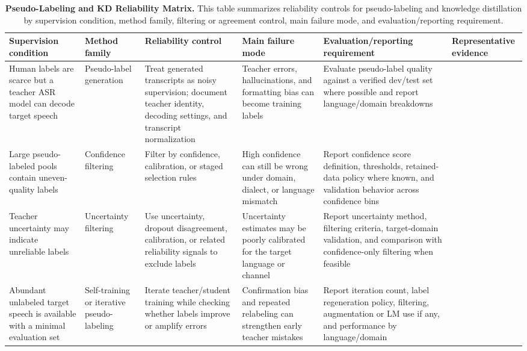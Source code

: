 \documentclass[pdflatex,sn-basic,iicol]{sn-jnl}
\theoremstyle{thmstyleone}
\theoremstyle{thmstyletwo}
\theoremstyle{thmstylethree}
\begin{document}
\begin{table}[htbp]
\setcounter{table}{3}
\footnotesize
\centering
\caption{\textbf{Pseudo-Labeling and KD Reliability Matrix.} This table summarizes reliability controls for pseudo-labeling and knowledge distillation by supervision condition, method family, filtering or agreement control, main failure mode, and evaluation/reporting requirement.}
\label{tab:4}
\begin{tabularx}{\textwidth}{YYYYYY}
\toprule
\textbf{Supervision condition} & \textbf{Method family} & \textbf{Reliability control} & \textbf{Main failure mode} & \textbf{Evaluation/reporting requirement} & \textbf{Representative evidence} \\
\midrule
Human labels are scarce but a teacher ASR model can decode target speech & Pseudo-label generation & Treat generated transcripts as noisy supervision; document teacher identity, decoding settings, and transcript normalization & Teacher errors, hallucinations, and formatting bias can become training labels & Evaluate pseudo-label quality against a verified dev/test set where possible and report language/domain breakdowns & \citep{kahn2019selftraining,park20d_interspeech,bhogale24_interspeech} \\
Large pseudo-labeled pools contain uneven-quality labels & Confidence filtering & Filter by confidence, calibration, or staged selection rules & High confidence can still be wrong under domain, dialect, or language mismatch & Report confidence score definition, thresholds, retained-data policy where known, and validation behavior across confidence bins & \citep{park20d_interspeech,khurana2020dust,bhogale24_interspeech} \\
Teacher uncertainty may indicate unreliable labels & Uncertainty filtering & Use uncertainty, dropout disagreement, calibration, or related reliability signals to exclude labels & Uncertainty estimates may be poorly calibrated for the target language or channel & Report uncertainty method, filtering criteria, target-domain validation, and comparison with confidence-only filtering when feasible & \citep{khurana2020dust} \\
Abundant unlabeled target speech is available with a minimal evaluation set & Self-training or iterative pseudo-labeling & Iterate teacher/student training while checking whether labels improve or amplify errors & Confirmation bias and repeated relabeling can strengthen early teacher mistakes & Report iteration count, label regeneration policy, filtering, augmentation or LM use if any, and performance by language/domain & \citep{kahn2019selftraining,likhomanenko2020slimipl,xu2020iterativepseudolabeling} \\

\end{tabularx}
\end{table}
\end{document}
